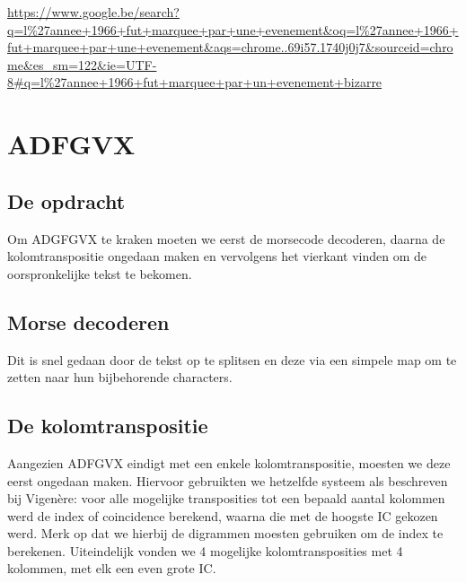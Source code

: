 
\urldef{\googleSearch}\url{https://www.google.be/search?q=l%27annee+1966+fut+marquee+par+une+evenement&oq=l%27annee+1966+fut+marquee+par+une+evenement&aqs=chrome..69i57.1740j0j7&sourceid=chrome&es_sm=122&ie=UTF-8#q=l%27annee+1966+fut+marquee+par+un+evenement+bizarre} %

\section{ADFGVX}
\subsection{De opdracht}
Om ADGFGVX te kraken moeten we eerst de morsecode decoderen, daarna de kolomtranspositie ongedaan maken en vervolgens het vierkant vinden om de oorspronkelijke tekst te bekomen.

\subsection{Morse decoderen}
Dit is snel gedaan door de tekst op te splitsen en deze via een simpele map om te zetten naar hun bijbehorende characters.

\subsection{De kolomtranspositie}
Aangezien ADFGVX eindigt met een enkele kolomtranspositie, moesten we deze eerst ongedaan maken. Hiervoor gebruikten we hetzelfde systeem als beschreven bij Vigen\`ere: voor alle mogelijke transposities tot een bepaald aantal kolommen werd de index of coincidence berekend, waarna die met de hoogste IC gekozen werd. Merk op dat we hierbij de digrammen moesten gebruiken om de index te berekenen. Uiteindelijk vonden we 4 mogelijke kolomtransposities met 4 kolommen, met elk een even grote IC.

